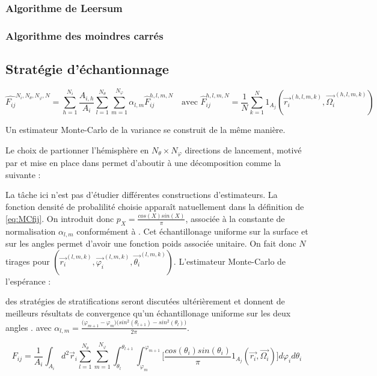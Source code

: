 \subsubsection{Algorithme de Leersum}
\subsubsection{Algorithme des moindres carrés}
\subsection{Stratégie d'échantionnage}

\begin{equation}
    \hat{F_{ij}}^{N_i, N_\theta, N_\varphi, N} =  \sum_{h = 1}^{N_i} \frac{A_{i,h}}{A_i} \sum_{l = 1}^{N_{\theta}} \sum_{m = 1}^{N_{\varphi}} \alpha_{l,m} \hat{F}_{ij}^{h,l,m, N} \quad \text{avec } \hat{F}_{ij}^{h,l,m, N} = \frac{1}{N} \sum_{k = 1}^{N} 1_{A_j}(\vec{r_i}^{(h,l,m,k)}, \vec{\Omega_i}^{(h,l,m,k)}) 
    \label{eq:fv1}
\end{equation}

Un estimateur Monte-Carlo de la variance se construit de la même manière.


Le choix de partionner l'hémisphère en $N_\theta \times N_\varphi$ directions de lancement, motivé par \cite{partition} et mise en place dans \cite{Romain25} permet d'aboutir à une décomposition comme la suivante :


La tâche ici n'est pas d'étudier différentes constructions d'estimateurs. La fonction densité de probalilité choisie apparaît natuellement dans la définition de \ref{eq:MCfij}. On introduit donc $p_X = \frac{cos(X)sin(X)}{\pi}$, associée à la constante de normalisation $ \alpha_{l,m} $ conformément à \cite{Romain25}. Cet échantillonage uniforme sur la surface et sur les angles permet d'avoir une fonction poids associée unitaire. On fait donc $N$ tirages pour $(\vec{r_i}^{(l,m,k)}, \vec{\varphi_i}^{(l,m,k)}, \vec{\theta_i}^{(l,m,k)})$. L'estimateur Monte-Carlo de l'espérance :


des stratégies de stratifications seront discutées ultérièrement et donnent de meilleurs résultats de convergence qu'un échantillonage uniforme sur les deux angles \cite{Romain25}.
avec    $\alpha_{l,m}= \frac{\big(\varphi_{m+1}- \varphi_{m} \big)\big(sin^2(\theta_{l+1})-sin^2(\theta_{l})\big)}{2\pi}$.

\begin{equation}
    F_{ij} = \frac{1}{A_i} \int_{A_i} d^2\vec{r}_i \sum_{l = 1}^{N_{\theta}} \sum_{m = 1}^{N_{\varphi}} \int_{\theta_{l}}^{\theta_{l+1}} \int_{\varphi_{m}}^{\varphi_{m+1}} \bigg[\frac{cos(\theta_i) sin(\theta_i)}{\pi} 1_{A_j}(\vec{r_i}, \vec{\Omega_i})\bigg] d\varphi_i d\theta_i
\label{eq:MCfij}
\end{equation}



